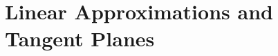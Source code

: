 \documentclass[a4paper, 11pt]{article}
\begin{document}
\maketitle
\thispagestyle{firstpage}

\setcounter{section}{2}
\setcounter{question}{20}

\section{Linear Approximations and Tangent Planes}

\end{document}
